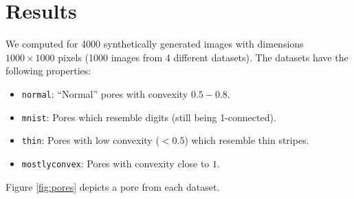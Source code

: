 \documentclass[reprint,amsmath,amssymb,aps,pre,showkeys,showpacs]{revtex4-1}
\newcommand{\highlight}[1]{{\color{red}{#1}}} %
\begin{document}
\section{Results}
We computed \highlight{awesomeness} for 4000 synthetically generated images with
dimensions $1000 \times 1000$ pixels (1000 images from 4 different
datasets). The datasets have the following properties:
\begin{itemize}
\item \texttt{normal}: ``Normal'' pores with convexity $0.5-0.8$.
\item \texttt{mnist}: Pores which resemble digits (still being 1-connected).
\item \texttt{thin}: Pores with low convexity ($< 0.5$) which resemble thin
  stripes.
\item \texttt{mostlyconvex}: Pores with convexity close to $1$.
\end{itemize}
Figure \ref{fig:pores} depicts a pore from each dataset.
\end{document}
